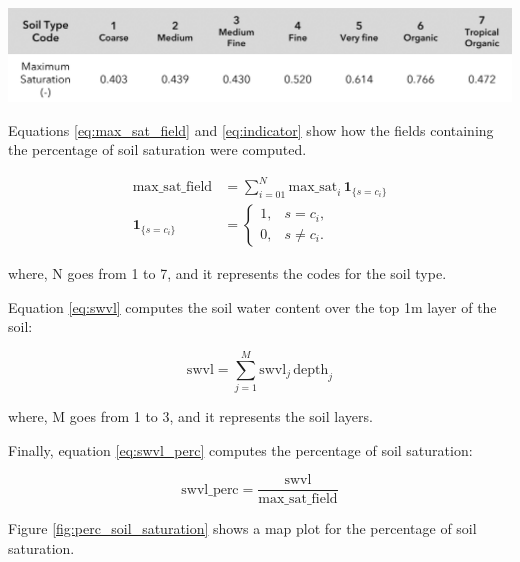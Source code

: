 \begin{table}[htbp]
\centering
{}
\includegraphics[width=\textwidth]{03_max_saturation.png}
\label{table:max_saturation}
\end{table}

Equations \ref{eq:max_sat_field} and \ref{eq:indicator} show how the fields containing the percentage of soil saturation were computed. 

\begin{align}
\text{max\_sat\_field}
  &= \sum_{i=01}^{N} \text{max\_sat}_i \,\mathbf{1}_{\{s=c_i\}}
     \label{eq:max_sat_field}\\
\mathbf{1}_{\{s=c_i\}}
  &=
  \begin{cases}
    1, & s=c_i,\\
    0, & s\neq c_i.
  \end{cases}
    \label{eq:indicator}
\end{align}

where, N goes from 1 to 7, and it represents the codes for the soil type.

Equation \ref{eq:swvl} computes the soil water content over the top 1m layer of the soil:

\begin{equation}
\label{eq:swvl}
\text{swvl} = \sum_{j=1}^{M} \text{swvl}_{j}\, \text{depth}_{j}
\end{equation}

where, M goes from 1 to 3, and it represents the soil layers.

Finally, equation \ref{eq:swvl_perc} computes the percentage of soil saturation:

\begin{equation}
\label{eq:swvl_perc}
\text{swvl\_perc} = \frac{\text{swvl}}{\text{max\_sat\_field}}
\end{equation}

Figure \ref{fig:perc_soil_saturation} shows a map plot for the percentage of soil saturation.

